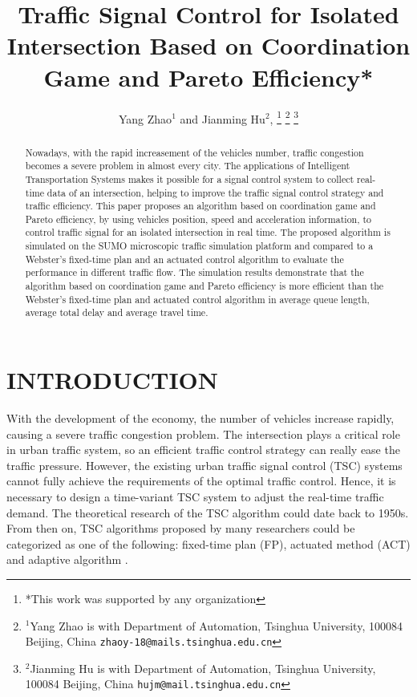 \documentclass[a4paper, 10pt, conference]{ieeeconf}      %
\title{\LARGE \bf
Traffic Signal Control for Isolated Intersection Based on Coordination Game and Pareto Efficiency*
}
\author{Yang Zhao$^{1}$ and Jianming Hu$^{2}$, \IEEEmembership{Member, IEEE}%
\thanks{*This work was supported by any organization}%
\thanks{$^{1}$Yang Zhao is with Department of Automation,
        Tsinghua University, 100084 Beijing, China
        {\tt\small zhaoy-18@mails.tsinghua.edu.cn}}%
\thanks{$^{2}$Jianming Hu is with Department of Automation,
        Tsinghua University, 100084 Beijing, China
        {\tt\small hujm@mail.tsinghua.edu.cn}}%
}
\begin{document}
\maketitle
\thispagestyle{empty}
\pagestyle{empty}


\begin{abstract}
Nowadays, with the rapid increasement of the vehicles number, traffic congestion becomes a severe problem in almost every city. 
The applications of Intelligent Transportation Systems makes it possible for a signal control system to collect real-time data 
of an intersection, helping to improve the traffic signal control strategy and traffic efficiency. This paper proposes an algorithm 
based on coordination game and Pareto efficiency, by using vehicles position, speed and acceleration information, 
to control traffic signal for an isolated intersection in real time. The proposed algorithm is simulated on the SUMO 
microscopic traffic simulation platform and compared to a Webster's fixed-time plan and an actuated control algorithm to 
evaluate the performance in different traffic flow. The simulation results demonstrate that the algorithm based on coordination
game and Pareto efficiency is more efficient than the Webster's fixed-time plan and actuated control algorithm in average queue 
length, average total delay and average travel time. 
\end{abstract}


\section{INTRODUCTION}
With the development of the economy, the number of vehicles increase rapidly, causing a severe traffic congestion problem. 
The intersection plays a critical role in urban traffic system, so an efficient traffic control strategy can really ease the traffic
pressure. However, the existing urban traffic signal control (TSC) systems cannot fully achieve the requirements of the optimal 
traffic control. Hence, it is necessary to design a time-variant TSC system to adjust the real-time traffic demand. 
The theoretical research of the TSC algorithm could date back to 1950s. From then on, TSC algorithms proposed by many researchers could 
be categorized as one of the following: fixed-time plan (FP), actuated method (ACT) and adaptive algorithm \cite{zhao2012computational}.
\end{document}
